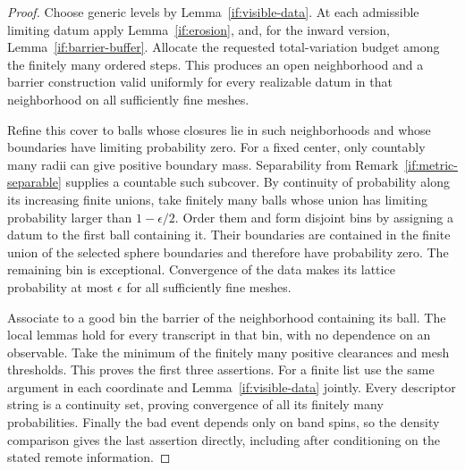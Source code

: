 \documentclass[11pt]{article}
\theoremstyle{definition}
\theoremstyle{remark}
\numberwithin{equation}{section}
\begin{document}
\begin{proof}
Choose generic levels by Lemma~\ref{if:visible-data}.  At each admissible
limiting datum apply Lemma~\ref{if:erosion}, and, for the inward version,
Lemma~\ref{if:barrier-buffer}.  Allocate the requested total-variation
budget among the finitely many ordered steps.  This produces an open
neighborhood and a barrier construction valid uniformly for every
realizable datum in that neighborhood on all sufficiently fine meshes.

Refine this cover to balls whose closures lie in such neighborhoods
and whose boundaries have limiting probability zero.  For a fixed
center, only countably many radii can give positive boundary mass.
Separability from Remark~\ref{if:metric-separable} supplies a countable
such subcover. By continuity of probability along its increasing finite
unions, take finitely many balls whose union has limiting
probability larger than $1-\epsilon/2$.  Order them and form disjoint
bins by assigning a datum to the first ball containing it.  Their
boundaries are contained in the finite union of the selected sphere
boundaries and therefore have probability zero.  The remaining bin
is exceptional.  Convergence of the data makes its lattice probability
at most $\epsilon$ for all sufficiently fine meshes.

Associate to a good bin the barrier of the neighborhood containing
its ball.  The local lemmas hold for every transcript in that bin,
with no dependence on an observable.  Take the minimum of the
finitely many positive clearances and mesh thresholds.  This proves
the first three assertions.  For a finite list use the same argument
in each coordinate and Lemma~\ref{if:visible-data} jointly.  Every
descriptor string is a continuity set, proving convergence of all
its finitely many probabilities.  Finally the bad event depends
only on band spins, so the density comparison gives the last
assertion directly, including after conditioning on the stated
remote information.
\end{proof}
\end{document}
